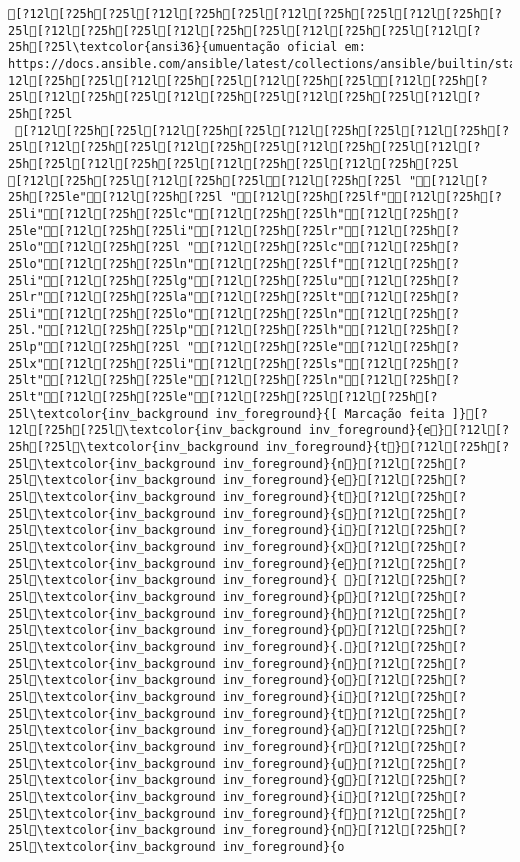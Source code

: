 \documentclass{scrartcl}
\begin{document}
\begin{Verbatim}
[?12l[?25h[?25l[?12l[?25h[?25l[?12l[?25h[?25l[?12l[?25h[?25l[?12l[?25h[?25l[?12l[?25h[?25l[?12l[?25h[?25l[?12l[?25h[?25l\textcolor{ansi36}{umuentação oficial em: https://docs.ansible.com/ansible/latest/collections/ansible/builtin/stat_module.html}[?12l[?25h[?25l[?12l[?25h[?25l[?12l[?25h[?25l[?12l[?25h[?25l[?12l[?25h[?25l[?12l[?25h[?25l[?12l[?25h[?25l[?12l[?25h[?25l
 [?12l[?25h[?25l[?12l[?25h[?25l[?12l[?25h[?25l[?12l[?25h[?25l[?12l[?25h[?25l[?12l[?25h[?25l[?12l[?25h[?25l[?12l[?25h[?25l[?12l[?25h[?25l[?12l[?25h[?25l[?12l[?25h[?25l
[?12l[?25h[?25l[?12l[?25h[?25l[?12l[?25h[?25l "[?12l[?25h[?25le"[?12l[?25h[?25l "[?12l[?25h[?25lf"[?12l[?25h[?25li"[?12l[?25h[?25lc"[?12l[?25h[?25lh"[?12l[?25h[?25le"[?12l[?25h[?25li"[?12l[?25h[?25lr"[?12l[?25h[?25lo"[?12l[?25h[?25l "[?12l[?25h[?25lc"[?12l[?25h[?25lo"[?12l[?25h[?25ln"[?12l[?25h[?25lf"[?12l[?25h[?25li"[?12l[?25h[?25lg"[?12l[?25h[?25lu"[?12l[?25h[?25lr"[?12l[?25h[?25la"[?12l[?25h[?25lt"[?12l[?25h[?25li"[?12l[?25h[?25lo"[?12l[?25h[?25ln"[?12l[?25h[?25l."[?12l[?25h[?25lp"[?12l[?25h[?25lh"[?12l[?25h[?25lp"[?12l[?25h[?25l "[?12l[?25h[?25le"[?12l[?25h[?25lx"[?12l[?25h[?25li"[?12l[?25h[?25ls"[?12l[?25h[?25lt"[?12l[?25h[?25le"[?12l[?25h[?25ln"[?12l[?25h[?25lt"[?12l[?25h[?25le"[?12l[?25h[?25l[?12l[?25h[?25l\textcolor{inv_background inv_foreground}{[ Marcação feita ]}[?12l[?25h[?25l\textcolor{inv_background inv_foreground}{e}[?12l[?25h[?25l\textcolor{inv_background inv_foreground}{t}[?12l[?25h[?25l\textcolor{inv_background inv_foreground}{n}[?12l[?25h[?25l\textcolor{inv_background inv_foreground}{e}[?12l[?25h[?25l\textcolor{inv_background inv_foreground}{t}[?12l[?25h[?25l\textcolor{inv_background inv_foreground}{s}[?12l[?25h[?25l\textcolor{inv_background inv_foreground}{i}[?12l[?25h[?25l\textcolor{inv_background inv_foreground}{x}[?12l[?25h[?25l\textcolor{inv_background inv_foreground}{e}[?12l[?25h[?25l\textcolor{inv_background inv_foreground}{ }[?12l[?25h[?25l\textcolor{inv_background inv_foreground}{p}[?12l[?25h[?25l\textcolor{inv_background inv_foreground}{h}[?12l[?25h[?25l\textcolor{inv_background inv_foreground}{p}[?12l[?25h[?25l\textcolor{inv_background inv_foreground}{.}[?12l[?25h[?25l\textcolor{inv_background inv_foreground}{n}[?12l[?25h[?25l\textcolor{inv_background inv_foreground}{o}[?12l[?25h[?25l\textcolor{inv_background inv_foreground}{i}[?12l[?25h[?25l\textcolor{inv_background inv_foreground}{t}[?12l[?25h[?25l\textcolor{inv_background inv_foreground}{a}[?12l[?25h[?25l\textcolor{inv_background inv_foreground}{r}[?12l[?25h[?25l\textcolor{inv_background inv_foreground}{u}[?12l[?25h[?25l\textcolor{inv_background inv_foreground}{g}[?12l[?25h[?25l\textcolor{inv_background inv_foreground}{i}[?12l[?25h[?25l\textcolor{inv_background inv_foreground}{f}[?12l[?25h[?25l\textcolor{inv_background inv_foreground}{n}[?12l[?25h[?25l\textcolor{inv_background inv_foreground}{o

\end{Verbatim}
\end{document}
